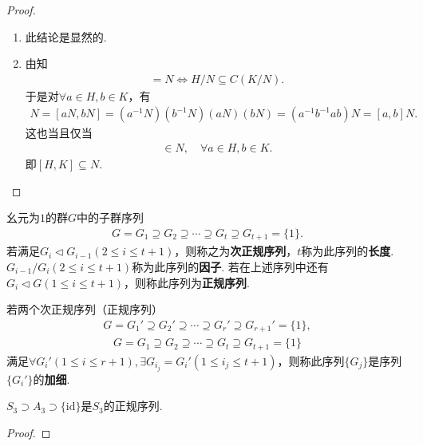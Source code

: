 \documentclass[../../main.tex]{subfiles}%
\begin{document}
\begin{proof}
\begin{enumerate}[(1)]
当$H\cap K\{1\}$时,有$[H,K]=1$,再由(1)可知$H\subseteq C_G(K)$,即$H$与$K$可换.

\item 此结论是显然的.

\item 由知
\begin{align*}
[H/N,K/N] = N \Longleftrightarrow H/N \subseteq C(K/N).
\end{align*}
于是对$\forall a\in H,b\in K$，有
\begin{align*}
N = [aN,bN] = (a^{-1}N)(b^{-1}N)(aN)(bN) = (a^{-1}b^{-1}ab)N = [a,b]N.
\end{align*}
这也当且仅当
\begin{align*}
[a,b] \in N,\quad \forall a\in H,b\in K.
\end{align*}
即$[H,K] \subseteq N$.
\end{enumerate}
\end{proof}

\begin{definition}
幺元为$1$的群$G$中的子群序列
\begin{align*}
G = G_1 \supseteq G_2 \supseteq \cdots \supseteq G_t \supseteq G_{t+1} = \{1\}.
\end{align*}
若满足$G_i \lhd G_{i-1}(2 \leqslant i \leqslant t+1)$，则称之为\textbf{次正规序列}，$t$称为此序列的\textbf{长度}.$G_{i-1}/G_i(2 \leqslant i \leqslant t+1)$称为此序列的\textbf{因子}.
若在上述序列中还有$G_i \lhd G(1 \leqslant i \leqslant t+1)$，则称此序列为\textbf{正规序列}.

若两个次正规序列（正规序列）
\begin{align*}
G = G_1' \supseteq G_2' \supseteq \cdots \supseteq G_r' \supseteq G_{r+1}' = \{1\},
\end{align*}
\begin{align*}
G = G_1 \supseteq G_2 \supseteq \cdots \supseteq G_t \supseteq G_{t+1} = \{1\}
\end{align*}
满足$\forall G_i'(1 \leqslant i \leqslant r+1), \exists G_{i_j} = G_i'(1 \leqslant i_j \leqslant t+1)$，则称此序列$\{G_j\}$是序列$\{G_i'\}$的\textbf{加细}.
\end{definition}

\begin{example}
$S_3 \supset A_3 \supset \{\mathrm{id}\}$是$S_3$的正规序列.
\end{example}
\begin{proof}

\end{proof}
\end{document}
